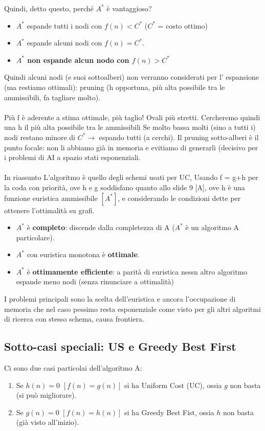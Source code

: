 Quindi, detto questo, perché $A^*$ è vantaggioso?
\begin{itemize}
    \item $A^*$ espande tutti i nodi con $f(n) < C^*$ ($C^*$ = costo ottimo)
    \item $A^*$ espande alcuni nodi con $f(n) = C^*$.
    \item \textbf{$A^*$ non espande alcun nodo con $f(n) > C^*$}
\end{itemize}
Quindi alcuni nodi (e suoi sottoalberi) non verranno considerati per l’ espansione (ma restiamo ottimali):
pruning (h opportuna, più alta possibile tra le ammissibili, fa tagliare molto).\\\\
Più f è aderente a stima ottimale, più taglio! Ovali più stretti. Cercheremo quindi una h il più alta possibile tra le ammissibili
Se molto bassa molti (sino a tutti i) nodi restano minore di $C^* \to$ espando tutti (a cerchi).
Il pruning sotto-alberi è il punto focale: non li abbiamo già in memoria e evitiamo di generarli (decisivo per i problemi di AI a spazio stati esponenziali.\\\\
In riassunto L’algoritmo è quello degli schemi usati per UC, Usando f = g+h per la coda con priorità, ove h e g soddisfano quanto allo slide 9 [A], 
ove h è una funzione euristica ammissibile $[A^*]$, e considerando le condizioni dette per ottenere l’ottimalità su grafi.
\begin{itemize}
    \item $A^*$ è \textbf{completo}: discende dalla completezza di A ($A^*$ è un algoritmo A particolare).
    \item $A^*$ con euristica monotona è \textbf{ottimale}.
    \item $A^*$ è \textbf{ottimamente efficiente}: a parità di euristica nessn altro algoritmo espande meno nodi (senza rinunciare a ottimalità)
\end{itemize}
I problemi principali sono la scelta dell'euristica e  ancora l'occupazione di memoria che nel caso
pessimo resta esponenziale come visto per gli altri algoritmi di ricerca con stesso schema, causa frontiera.

\subsection{Sotto-casi speciali: US e Greedy Best First}
Ci sono due casi particolai dell'algoritmo A:
\begin{enumerate}
    \item Se $h(n) = 0$ $[f(n) = g(n)]$ si ha Uniform Cost (UC), ossia $g$ non basta (si può migliorare).
    \item Se $g(n) = 0$ $[f(n) = h(n)]$ si ha Greedy Best Fist, ossia $h$ non basta (già visto all'inizio).
\end{enumerate}
